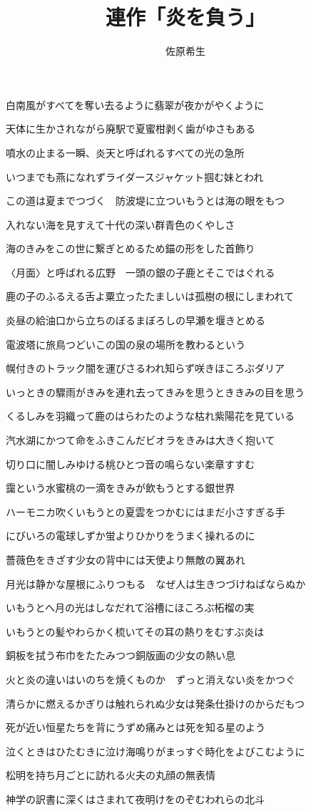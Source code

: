 \documentclass[b5j,twoside]{utarticle}
\title{\huge 連作「炎を負う」}
\author{\hspace{30mm} \Large  佐原希生}
\date{\vspace{-5mm}}
\makeatletter
\def\yakuchu{%
\@ifnextchar[\@xfootnote %
{\stepcounter{yakuchu}%
\protected@xdef\@thefnmark{\theyakuchu}%
\@footnotemark\@footnotetext}}
\makeatother
\begin{document}
\fontsize{17pt}{17pt}\selectfont
\maketitle

\setlength{\footskip}{-2mm}
\chead[]{}
\rhead[連作「炎を負う」]{}
\lfoot[]{\thepage{}}
\cfoot[]{}
\rfoot[\thepage{}]{}

\let\yakuchu=\endnote
\renewcommand{\footnoterule}{\noindent\rule{100mm}{0.3mm}\vskip2mm}
\thispagestyle{fancy}
白南風がすべてを奪い去るように翡翠が夜かがやくように

天体に生かされながら廃駅で夏蜜柑剥く歯がゆさもある

噴水の止まる一瞬、炎天と呼ばれるすべての光の急所

いつまでも燕になれずライダースジャケット掴む妹とわれ

この道は夏までつづく　防波堤に立ついもうとは海の眼をもつ

入れない海を見すえて十代の深い群青色のくやしさ

海のきみをこの世に繋ぎとめるため錨の形をした首飾り

〈月面〉と呼ばれる広野　一頭の銀の子鹿とそこではぐれる

鹿の子のふるえる舌よ粟立ったたましいは孤樹の根にしまわれて

炎昼の給油口から立ちのぼるまぼろしの早瀬を堰きとめる

電波塔に旅鳥つどいこの国の泉の場所を教わるという

幌付きのトラック闇を運びさるわれ知らず咲きほころぶダリア

いっときの驟雨がきみを連れ去ってきみを思うとききみの目を思う

くるしみを羽織って鹿のはらわたのような枯れ紫陽花を見ている

汽水湖にかつて命をふきこんだビオラをきみは大きく抱いて

切り口に闇しみゆける桃ひとつ音の鳴らない楽章すすむ

靄という水蜜桃の一滴をきみが飲もうとする銀世界

ハーモニカ吹くいもうとの夏雲をつかむにはまだ小さすぎる手

にびいろの電球しずか蛍よりひかりをうまく操れるのに

薔薇色をきざす少女の背中には天使より無敵の翼あれ

月光は静かな屋根にふりつもる　なぜ人は生きつづけねばならぬか

いもうとへ月の光はしなだれて浴槽にほころぶ柘榴の実

いもうとの髪やわらかく梳いてその耳の熱りをむすぶ炎は

銅板を拭う布巾をたたみつつ銅版画の少女の熱い息

火と炎の違いはいのちを焼くものか　ずっと消えない炎をかつぐ

清らかに燃えるかぎりは触れられぬ少女は発条仕掛けのからだもつ

死が近い恒星たちを背にうずめ痛みとは死を知る星のよう

泣くときはひたむきに泣け海鳴りがまっすぐ時化をよびこむように

松明を持ち月ごとに訪れる火夫の丸顔の無表情

神学の訳書に深くはさまれて夜明けをのぞむわれらの北斗
\end{document}
